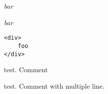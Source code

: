 \emph{bar}

\emph{bar}

\begin{verbatim}
<div>
    foo
</div>
\end{verbatim}

test. Comment 

test. Comment 
with
multiple
line. 
